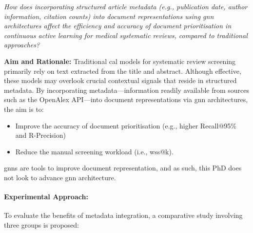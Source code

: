 \documentclass[10pt,oneside]{book}
\begin{document}
\emph{How does incorporating structured article metadata (e.g., publication date, author information, citation counts) into document representations using \gls*{gnn} architectures affect the efficiency and accuracy of document prioritisation in continuous active learning for medical systematic reviews, compared to traditional approaches?}

\textbf{Aim and Rationale:}
Traditional \gls*{cal} models for systematic review screening primarily rely on text extracted from the title and abstract. Although effective, these models may overlook crucial contextual signals that reside in structured metadata. By incorporating metadata—information readily available from sources such as the OpenAlex API—into document representations via \gls*{gnn} architectures, the aim is to: \begin{itemize} \item Improve the accuracy of document prioritisation (e.g., higher Recall@95\% and R-Precision)
\item Reduce the manual screening workload (i.e., wss@k). \end{itemize}

\gls*{gnn}s are tools to improve document representation, and as such, this PhD does not look to advance \gls*{gnn} architecture. 

\paragraph{Experimental Approach: } 

To evaluate the benefits of metadata integration, a comparative study involving three groups is proposed:
\end{document}
